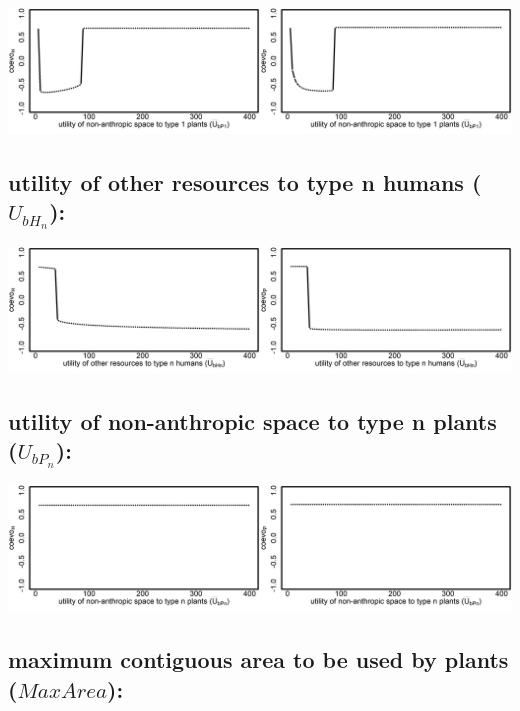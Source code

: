 \documentclass[]{book}
\begin{document}
\includegraphics[width=1\linewidth]{plots/2_onePar-U.bP1_bifplot-pair}

\hypertarget{utility-of-other-resources-to-type-n-humans-u_bh_n}{%
\subsection{\texorpdfstring{utility \textbf{of} other resources \textbf{to} type n humans (\(U_{bH_{n}}\)):}{utility of other resources to type n humans (U\_\{bH\_\{n\}\}):}}\label{utility-of-other-resources-to-type-n-humans-u_bh_n}}

\includegraphics[width=1\linewidth]{plots/2_onePar-U.bHn_bifplot-pair}

\hypertarget{utility-of-non-anthropic-space-to-type-n-plants-u_bp_n}{%
\subsection{\texorpdfstring{utility \textbf{of} non-anthropic space \textbf{to} type n plants (\(U_{bP_{n}}\)):}{utility of non-anthropic space to type n plants (U\_\{bP\_\{n\}\}):}}\label{utility-of-non-anthropic-space-to-type-n-plants-u_bp_n}}

\includegraphics[width=1\linewidth]{plots/2_onePar-U.bPn_bifplot-pair}

\hypertarget{maximum-contiguous-area-to-be-used-by-plants-maxarea}{%
\subsection{\texorpdfstring{maximum contiguous area to be used by plants (\(MaxArea\)):}{maximum contiguous area to be used by plants (MaxArea):}}\label{maximum-contiguous-area-to-be-used-by-plants-maxarea}}
\end{document}
